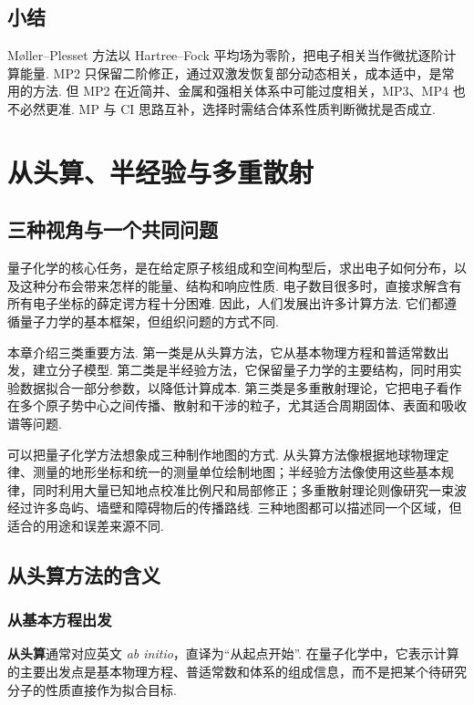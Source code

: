 \documentclass[UTF8,11pt,a4paper,openany]{ctexbook}
\newcommand{\term}[1]{\textbf{#1}}
\begin{document}
\section{小结}

Møller--Plesset 方法以 Hartree--Fock 平均场为零阶，把电子相关当作微扰逐阶计算能量. MP2 只保留二阶修正，通过双激发恢复部分动态相关，成本适中，是常用的方法. 但 MP2 在近简并、金属和强相关体系中可能过度相关，MP3、MP4 也不必然更准. MP 与 CI 思路互补，选择时需结合体系性质判断微扰是否成立. 

\chapter{从头算、半经验与多重散射}

\section{三种视角与一个共同问题}

量子化学的核心任务，是在给定原子核组成和空间构型后，求出电子如何分布，以及这种分布会带来怎样的能量、结构和响应性质. 电子数目很多时，直接求解含有所有电子坐标的薛定谔方程十分困难. 因此，人们发展出许多计算方法. 它们都遵循量子力学的基本框架，但组织问题的方式不同. 

本章介绍三类重要方法. 第一类是从头算方法，它从基本物理方程和普适常数出发，建立分子模型. 第二类是半经验方法，它保留量子力学的主要结构，同时用实验数据拟合一部分参数，以降低计算成本. 第三类是多重散射理论，它把电子看作在多个原子势中心之间传播、散射和干涉的粒子，尤其适合周期固体、表面和吸收谱等问题. 

\begin{analogybox}
可以把量子化学方法想象成三种制作地图的方式. 从头算方法像根据地球物理定律、测量的地形坐标和统一的测量单位绘制地图；半经验方法像使用这些基本规律，同时利用大量已知地点校准比例尺和局部修正；多重散射理论则像研究一束波经过许多岛屿、墙壁和障碍物后的传播路线. 三种地图都可以描述同一个区域，但适合的用途和误差来源不同. 
\end{analogybox}

\section{从头算方法的含义}

\subsection{从基本方程出发}

\term{从头算}通常对应英文 \emph{ab initio}，直译为“从起点开始”. 在量子化学中，它表示计算的主要出发点是基本物理方程、普适常数和体系的组成信息，而不是把某个待研究分子的性质直接作为拟合目标. 
\end{document}
